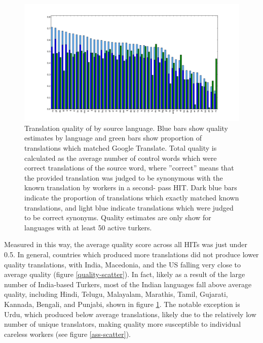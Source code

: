 \documentclass[11pt]{article}
\begin{document}
\begin{figure}[h]
\centering
\includegraphics[width=6in]{figures/quality-hitlang-goog}
\caption{Translation quality of by source language. Blue bars show quality estimates by language and green bars show proportion of translations which matched Google Translate. Total quality is calculated as the average number of control words which were correct translations of the source word, where ”correct” means that the provided translation was judged to be synonymous with the known translation by workers in a second-
pass HIT. Dark blue bars indicate the proportion of translations which exactly matched known translations, and light blue indicate translations which were judged to be correct synonyms. Quality estimates are only show for languages with at least 50 active turkers.}
\label{hitlangqual-bar}
\end{figure}

Measured in this way, the average quality score across all HITs was just under 0.5. In general, countries which produced more translations did not produce lower quality translations, with India, Macedonia, and the US falling very close to average quality (figure \ref{quality-scatter}). In fact, likely as a result of the large number of India-based Turkers, most of the Indian languages fall above average quality, including Hindi, Telugu, Malayalam, Marathis, Tamil, Gujarati, Kannada, Bengali, and Punjabi, shown in figure \ref{hitlangqual-bar}. The notable exception is Urdu, which produced below average translations, likely due to the relatively low number of unique translators, making quality more susceptible to individual careless workers (see figure \ref{ass-scatter}). 


\end{document}
